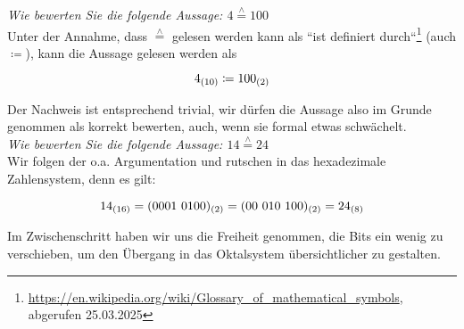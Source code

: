 \textit{Wie bewerten Sie die folgende Aussage: $4 \overset{\wedge}{=} 100$}\\

\noindent
Unter der Annahme, dass $\overset{\wedge}{=}$ gelesen werden kann als ``ist definiert durch``\footnote{
    \url{https://en.wikipedia.org/wiki/Glossary_of_mathematical_symbols}, abgerufen 25.03.2025
} (auch $\coloneq$), kann die Aussage gelesen werden als

\begin{equation}\notag
    4_{(10)} \coloneq 100_{(2)}
\end{equation}

\noindent
Der Nachweis ist entsprechend trivial, wir dürfen die Aussage also im Grunde genommen als korrekt bewerten, auch, wenn sie formal etwas schwächelt.\\

\noindent
\textit{Wie bewerten Sie die folgende Aussage: $14 \overset{\wedge}{=} 24$}\\

\noindent
Wir folgen der o.a. Argumentation und rutschen in das hexadezimale Zahlensystem, denn es gilt:

\begin{equation}\notag
14_{(16)} = (0001 \ 0100)_{(2)} = (00 \ 010 \ 100)_{(2)} = 24_{(8)}
\end{equation}

\noindent
Im Zwischenschritt haben wir uns die Freiheit genommen, die Bits ein wenig zu verschieben, um den Übergang in das Oktalsystem übersichtlicher zu gestalten.
